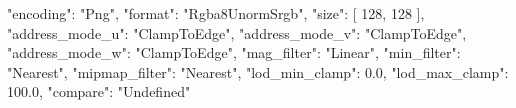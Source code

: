 {
    "encoding": "Png",
    "format": "Rgba8UnormSrgb",
    "size": [
        128,
        128
    ],
    "address_mode_u": "ClampToEdge",
    "address_mode_v": "ClampToEdge",
    "address_mode_w": "ClampToEdge",
    "mag_filter": "Linear",
    "min_filter": "Nearest",
    "mipmap_filter": "Nearest",
    "lod_min_clamp": 0.0,
    "lod_max_clamp": 100.0,
    "compare": "Undefined"
}